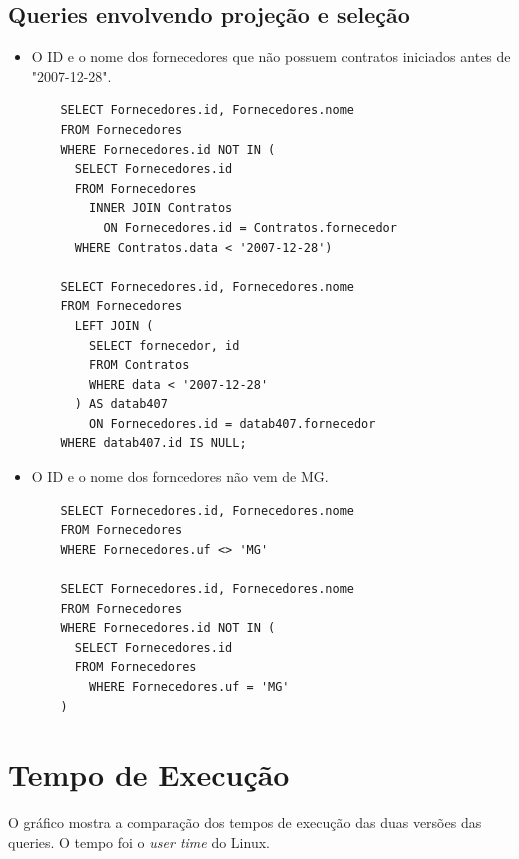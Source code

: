 \documentclass{article}
\begin{document}
\subsection{Queries envolvendo projeção e seleção}
\begin{itemize}
\item O ID e o nome dos fornecedores que não possuem contratos iniciados antes de "2007-12-28".
  \begin{verbatim}
    SELECT Fornecedores.id, Fornecedores.nome
    FROM Fornecedores
    WHERE Fornecedores.id NOT IN (
      SELECT Fornecedores.id
      FROM Fornecedores
        INNER JOIN Contratos
          ON Fornecedores.id = Contratos.fornecedor
      WHERE Contratos.data < '2007-12-28')
      
    SELECT Fornecedores.id, Fornecedores.nome
    FROM Fornecedores
      LEFT JOIN (
        SELECT fornecedor, id
        FROM Contratos
        WHERE data < '2007-12-28'
      ) AS datab407
        ON Fornecedores.id = datab407.fornecedor 
    WHERE datab407.id IS NULL;
    \end{verbatim}
\item O ID e o nome dos forncedores não vem de MG.
  \begin{verbatim}
    SELECT Fornecedores.id, Fornecedores.nome
    FROM Fornecedores
    WHERE Fornecedores.uf <> 'MG'

    SELECT Fornecedores.id, Fornecedores.nome
    FROM Fornecedores
    WHERE Fornecedores.id NOT IN (
      SELECT Fornecedores.id
      FROM Fornecedores
	    WHERE Fornecedores.uf = 'MG'
    )

    \end{verbatim}
\end{itemize}

\section{Tempo de Execução}
O gráfico mostra a comparação dos tempos de execução das duas versões das queries.
O tempo foi o \textit{user time} do Linux.
\begin{figure}[H]
  \begin{center}  
        
  \end{center}  
  \label{fig:graph}
\end{figure}
\end{document}
